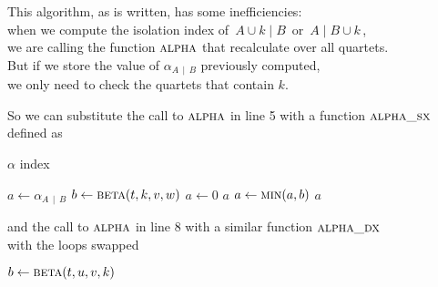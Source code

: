\documentclass[./main.tex]{subfiles}
\begin{document}
\clearpage

This algorithm, as is written, has some inefficiencies: \\
\bsp when we compute the isolation index of $\, A \cup k \mathbin{|} B \,$ or $\, A \mathbin{|} B \cup k \,$, \\
\bsp we are calling the function $\textsc{alpha}$ that recalculate over all quartets. \\
But if we store the value of $\alpha_{A \,\mathbin{|}\, B}$ previously computed, \\
\bsp we only need to check the quartets that contain $k$.

So we can substitute the call to $\textsc{alpha}$ in line 5 with a function $\textsc{alpha\_sx}$ \\
defined as\bigskip

\begin{algorithm}
\caption{$\alpha$ index}
\begin{algorithmic}[1]
        \State $a \gets \alpha_{A \,\mathbin{|}\, B}$ 
         
                \State $b \gets \Call{beta}{t,k,v,w}$ 
                    \State $a \gets 0$
                    \State \Return $a$
                \Else
                    \State $a \gets \Call{min}{a,b}$
                \EndIf
            \EndFor
        \EndFor
        \State \Return $a$
    \EndFunction
\end{algorithmic}
\end{algorithm}\medskip

and the call to $\textsc{alpha}$ in line 8 with a similar function $\textsc{alpha\_dx}$ \\
with the loops swapped\bigskip

\hspace*{1cm}
\begin{minipage}{\dimexpr\linewidth-1.1cm}
\begin{algorithmic}\noEnd\noIndLines{}
             
                \State $b \gets \Call{beta}{t,u,v,k}$ 
            \EndFor
        \EndFor
\end{algorithmic}
\end{minipage}\bigskip\bigskip
\end{document}
